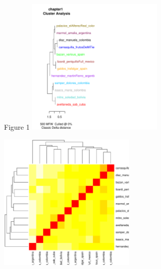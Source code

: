 \documentclass[12pt]{report}
\newenvironment{knitrout}{}{} %
\begin{document}
Figure 1
\begin{knitrout}
\color{fgcolor}
\includegraphics[width=250,height=250]{figure/Figure_1-1} 

\includegraphics[width=250,height=250]{figure/Figure_1-2} 

\end{knitrout}
\end{document}
